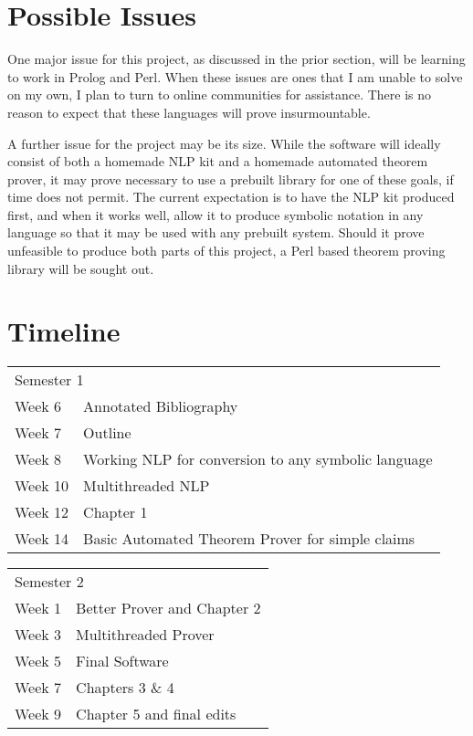 \documentclass{article}
\begin{document}
\section{Possible Issues}
One major issue for this project, as discussed in the prior section, will be learning to work in Prolog and Perl. When these issues are ones that I am unable to solve on my own, I plan to turn to online communities for assistance. There is no reason to expect that these languages will prove insurmountable.

A further issue for the project may be its size. While the software will ideally consist of both a homemade NLP kit and a homemade automated theorem prover, it may prove necessary to use a prebuilt library for one of these goals, if time does not permit. The current expectation is to have the NLP kit produced first, and when it works well, allow it to produce symbolic notation in any language so that it may be used with any prebuilt system. Should it prove unfeasible to produce both parts of this project, a Perl based theorem proving library will be sought out.

\section{Timeline}
\begin{table}[H]
\begin{tabular}{ll}
	\multicolumn{2}{l}{Semester 1}  \\
Week 6  & Annotated Bibliography \\
Week 7  & Outline \\
Week 8  & Working NLP for conversion to any symbolic language \\
Week 10	& Multithreaded NLP \\
Week 12 & Chapter 1 \\
Week 14 & Basic Automated Theorem Prover for simple claims
\end{tabular}
\end{table}

\begin{table}[H]
\begin{tabular}{ll}
	\multicolumn{2}{l}{Semester 2}  \\
Week 1  & Better Prover and Chapter 2 \\
Week 3  & Multithreaded Prover \\
Week 5	& Final Software \\
Week 7 & Chapters 3 \& 4\\
Week 9 & Chapter 5 and final edits
\end{tabular}
\end{table}

\nocite{*}
{}
\end{document}
